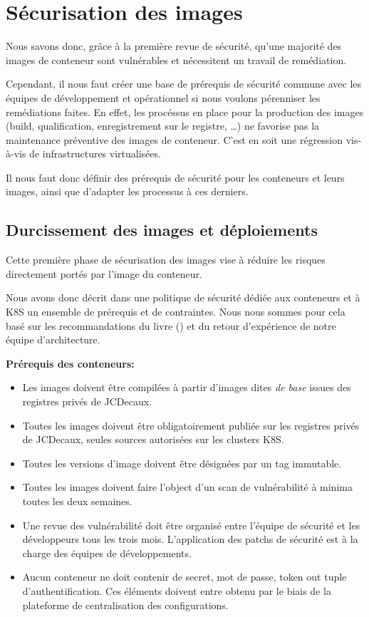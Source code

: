 \section{Sécurisation des images}
Nous savons donc, grâce à la première revue de sécurité, qu'une majorité des images de conteneur sont vulnérables et 
nécessitent un travail de remédiation.

Cependant, il nous faut créer une base de prérequis de sécurité commune avec les équipes de développement et 
opérationnel si nous voulons pérenniser les remédiations faites. 
\newline En effet, les procéssus en place pour la production des images (\ie build, qualification, enregistrement sur le
registre, \dots) ne favorise pas la maintenance préventive des images de conteneur. C'est en soit une régression 
vis-à-vis de infrastructures virtualisées.

Il nous faut donc définir des prérequis de sécurité pour les conteneurs et leurs images, ainsi que d'adapter les processus
à ces derniers.

\subsection{Durcissement des images et déploiements}
Cette première phase de sécurisation des images vise à réduire les risques directement portés par l'image du conteneur.

Nous avons donc décrit dans une politique de sécurité dédiée aux conteneurs et à \ac{K8S} un ensemble de prérequis et de 
contraintes. Nous nous sommes pour cela basé sur les recommandations du livre 
(\citeauthor{kub_sercuity_rice_2018})\autocite{kub_sercuity_rice_2018} et du retour d'expérience de notre équipe 
d'architecture.

\textbf{Prérequis des conteneurs:}
\begin{itemize}
    \item Les images doivent être compilées à partir d'images dites \emph{de base} issues des registres privés de JCDecaux.
    \item Toutes les images doivent être obligatoirement publiée sur les registres privés de JCDecaux, seules sources 
    autorisées sur les clusters \ac{K8S}.
    \item Toutes les versions d'image doivent être désignées par un tag immutable.
    \item Toutes les images doivent faire l'object d'un scan de vulnérabilité à minima toutes les deux semaines.
    \item Une revue des vulnérabilité doit être organisé entre l'équipe de sécurité et les développeurs tous les trois mois.
    L'application des patchs de sécurité est à la charge des équipes de développements.
    \item Aucun conteneur ne doit contenir de secret, mot de passe, token out tuple d'authentification. Ces éléments doivent
    entre obtenu par le biais de la plateforme de centralisation des configurations.
\end{itemize}

